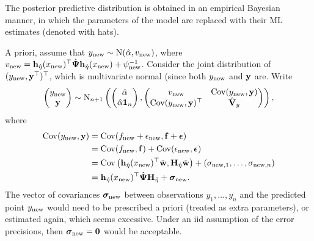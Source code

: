 The posterior predictive distribution is obtained in an empirical Bayesian manner, in which the parameters of the model are replaced with their ML estimates (denoted with hats).


A priori, assume that $y_{\text{new}} \sim \operatorname{N}(\hat\alpha, v_{\text{new}})$, where $v_{\text{new}} =  {\mathbf h}_{\hat\eta}(x_{\text{new}})^\top \hat{{\bm\Psi}} {\mathbf h}_{\hat\eta}(x_{\text{new}}) + \psi^{-1}_{\text{new}} $.
Consider the joint distribution of $(y_{\text{new}},{\mathbf y}^\top)^\top$, which is multivariate normal (since both $y_{\text{new}}$ and ${\mathbf y}$ are.
Write
\[
  \begin{pmatrix}
    y_{\text{new}} \\
    {\mathbf y}
  \end{pmatrix}
  \sim \operatorname{N}_{n+1}
  \left(
    \begin{pmatrix}
      \hat\alpha \\
      \hat\alpha{\mathbf 1}_n
    \end{pmatrix},
    \begin{pmatrix}
      v_{\text{new}} &\operatorname{Cov}(y_{\text{new}},{\mathbf y}) \\
      \operatorname{Cov}(y_{\text{new}},{\mathbf y})^\top &\hat{{\mathbf V}}_y \\
    \end{pmatrix}
  \right),
\]
where 
\begin{align*}
  \operatorname{Cov}(y_{\text{new}},{\mathbf y})
  &= \operatorname{Cov}(f_{\text{new}} + \epsilon_{\text{new}}, {\mathbf f} + {\bm\epsilon}) \\
  &= \operatorname{Cov}(f_{\text{new}}, {\mathbf f}) + \operatorname{Cov}(\epsilon_{\text{new}}, {\bm\epsilon})\\
  &= \operatorname{Cov}\left({\mathbf h}_{\hat\eta}(x_{\text{new}})^\top \tilde{\mathbf w},{\mathbf H}_{\hat\eta}\tilde{\mathbf w} \right) + (\sigma_{{\text{new}},1},\dots,\sigma_{{\text{new}},n}) \\
  &= {\mathbf h}_{\hat\eta}(x_{\text{new}})^\top\hat{{\bm\Psi}}{\mathbf H}_{\hat\eta} + {\bm\sigma}_{\text{new}}.
\end{align*}
The vector of covariances ${\bm\sigma}_{\text{new}}$ between observations $y_1,\dots,y_n$ and the predicted point $y_{\text{new}}$ would need to be prescribed a priori (treated as extra parameters), or estimated again, which seems excessive.
Under an iid assumption of the error precisions, then ${\bm\sigma}_{\text{new}} = {\mathbf 0}$ would be acceptable.


